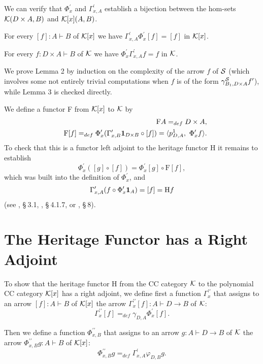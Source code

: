We can verify that $\Phi _{x}^{\prime }$ and $\Gamma _{x,A}^{\prime }$
establish a bijection between the hom-sets ${\cal K}(D\times A,B)$ and $%
{\cal K}[x](A,B)$.

\begin{lemma}
For every $[f]:A\vdash B$ of ${\cal K}[x]$ we have $\Gamma _{x,A}^{\prime
}\Phi _{x}^{\prime }[f]=[f]$ in ${\cal K}[x]$.
\end{lemma}

\begin{lemma}
For every $f:D\times A\vdash B$ of ${\cal K}$ we have $\Phi _{x}^{\prime
}\Gamma _{x,A}^{\prime }f=f$ in ${\cal K}$.
\end{lemma}

\noindent We prove Lemma 2 by induction on the complexity of the arrow $f$
of ${\cal S}$ (which involves some not entirely trivial computations when $f$
is of the form $\gamma _{B_{1},D\times A}^{{\cal S}}f^{\prime }$), while
Lemma 3 is checked directly.

We define a functor F from ${\cal K}[x]$ to ${\cal K}$ by 
\begin{eqnarray*}
&&\text{F}A=_{def}D\times A, \\
&&\text{F}[f]=_{def}\Phi _{x}^{\prime }(\Gamma _{x,B}^{\prime }{\bf 1}%
_{D\times B}\circ [f])=\langle p_{D,A}^{1},~\Phi _{x}^{\prime }f\rangle .
\end{eqnarray*}
To check that this is a functor left adjoint to the heritage functor H it
remains to establish 
\[
\Phi _{x}^{\prime }([g]\circ [f])=\Phi _{x}^{\prime }[g]\circ \text{F}[f], 
\]
which was built into the definition of $\Phi _{x}^{\prime }$, and 
\[
\Gamma _{x,A}^{\prime }(f\circ \Phi _{x}^{\prime }{\bf 1}_{A})=[f]=\text{H}f 
\]
(see \cite{D.96}, \S $~$3.1, \cite{D.99}, \S $~$4.1.7, or \cite{D.99a}, \S $%
~ $8).

\section{The Heritage Functor has a Right Adjoint}

\noindent To show that the heritage functor H from the CC category ${\cal K}$
to the polynomial CC category ${\cal K}[x]$ has a right adjoint, we define
first a function $\Gamma _{x}^{\prime \prime }$ that assigns to an arrow $%
[f]:A\vdash B$ of ${\cal K}[x]$ the arrow $\Gamma _{x}^{\prime \prime
}[f]:A\vdash D\rightarrow B$ of ${\cal K}$: 
\[
\Gamma _{x}^{\prime \prime }[f]=_{def}\gamma _{D,A}\Phi _{x}^{\prime }[f]. 
\]

\noindent Then we define a function $\Phi _{x,B}^{\prime \prime }$ that
assigns to an arrow $g:A\vdash D\rightarrow B$ of ${\cal K}$ the arrow $\Phi
_{x,B}^{\prime \prime }g:A\vdash B$ of ${\cal K}[x]$: 
\[
\Phi _{x,B}^{\prime \prime }g=_{def}\Gamma _{x,A}^{\prime }\varphi _{D,B}g. 
\]

